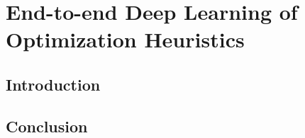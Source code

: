 \chapter{End-to-end Deep Learning of Optimization Heuristics}

\section{Introduction}

\lipsum[1-2]



\section{Conclusion}

\lipsum[1-2]
